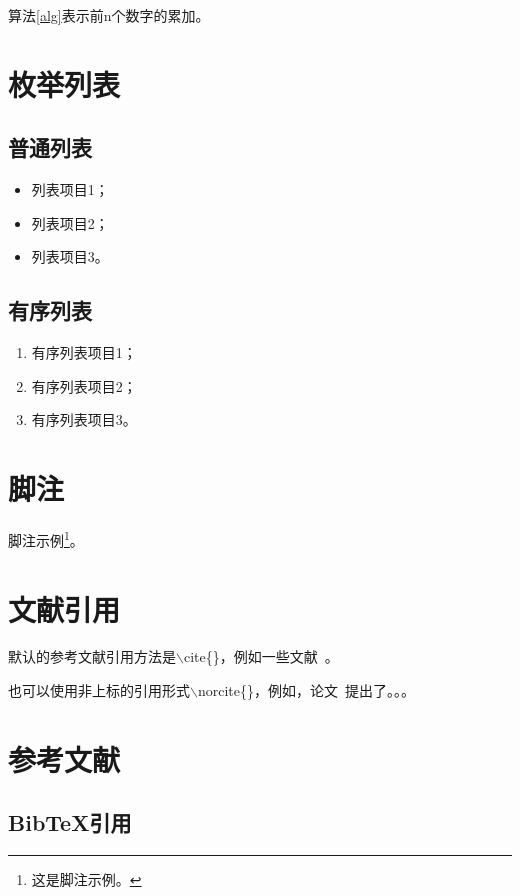 算法\ref{alg}表示前n个数字的累加。


\section{枚举列表}

\subsection{普通列表}

\begin{itemize}
    \item 列表项目1；
    \item 列表项目2；
    \item 列表项目3。
\end{itemize}

\subsection{有序列表}

\begin{enumerate}
    \item 有序列表项目1；
    \item 有序列表项目2；
    \item 有序列表项目3。
\end{enumerate}


\section{脚注}

脚注示例\footnote{这是脚注示例。}。


\section{文献引用}

默认的参考文献引用方法是$\backslash$cite\{\}，例如一些文献~\cite{kearns1994introduction,shalev2014understanding}。

也可以使用非上标的引用形式$\backslash$norcite\{\}，例如，论文~提出了。。。


\section{参考文献}

\subsection{BibTeX引用}

